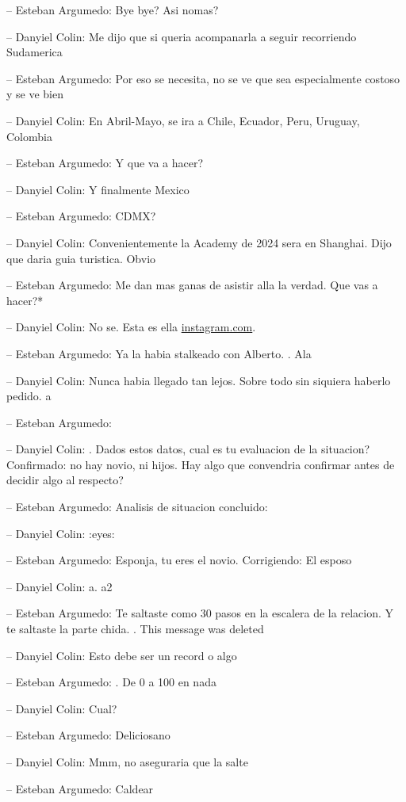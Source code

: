 -- Esteban Argumedo: Bye bye? Asi nomas?

-- Danyiel Colin: Me dijo que si queria acompanarla a seguir recorriendo
Sudamerica

-- Esteban Argumedo: Por eso se necesita, no se ve que sea especialmente
costoso y se ve bien

-- Danyiel Colin: En Abril-Mayo, se ira a Chile, Ecuador, Peru, Uruguay,
Colombia

-- Esteban Argumedo: Y que va a hacer?

-- Danyiel Colin: Y finalmente Mexico

-- Esteban Argumedo: CDMX?

-- Danyiel Colin: Convenientemente la Academy de 2024 sera en Shanghai.
Dijo que daria guia turistica. Obvio

-- Esteban Argumedo: Me dan mas ganas de asistir alla la verdad. Que vas
a hacer?*

-- Danyiel Colin: No se. Esta es ella
\href{https://instagram.com/sssorryimlate?igshid=YmMyMTA2M2Y=}{instagram.com}.

-- Esteban Argumedo: Ya la habia stalkeado con Alberto. . Ala

-- Danyiel Colin: Nunca habia llegado tan lejos. Sobre todo sin siquiera
haberlo pedido. a

-- Esteban Argumedo:

-- Danyiel Colin: . Dados estos datos, cual es tu evaluacion de la
situacion? Confirmado: no hay novio, ni hijos. Hay algo que convendria
confirmar antes de decidir algo al respecto?

-- Esteban Argumedo: Analisis de situacion concluido:

-- Danyiel Colin: :eyes:

-- Esteban Argumedo: Esponja, tu eres el novio. Corrigiendo: El esposo

-- Danyiel Colin: a. a2

-- Esteban Argumedo: Te saltaste como 30 pasos en la escalera de la
relacion. Y te saltaste la parte chida. . This message was deleted

-- Danyiel Colin: Esto debe ser un record o algo

-- Esteban Argumedo: . De 0 a 100 en nada

-- Danyiel Colin: Cual?

-- Esteban Argumedo: Deliciosano

-- Danyiel Colin: Mmm, no aseguraria que la salte

-- Esteban Argumedo: Caldear


